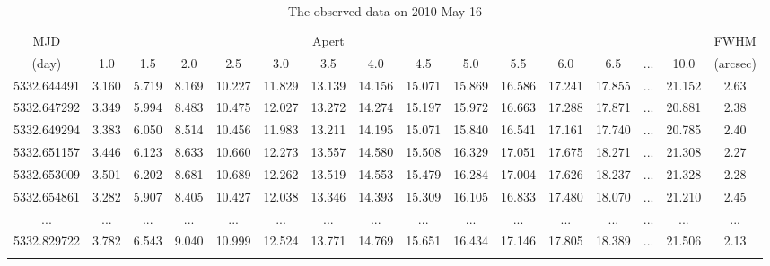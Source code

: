 \documentclass[structabstract]{raa}
\begin{document}
\begin{table}
\begin{center}
\begin{minipage}[]{100mm}
\caption[]{The observed data on 2010 May 16}
\label{Table3}
 \end{minipage}
 \setlength{\tabcolsep}{2.5pt}
\small
\begin{tabular}{cccccccccccccccc}
\hline\noalign{\smallskip}
  MJD  &   &   &   &  & &  Apert &    &    &   &  & &   &   &   &  FWHM  \\ \cline{2-15}

  (day)  &1.0  & 1.5  &2.0   & 2.5 &  3.0  & 3.5   & 4.0  & 4.5   &5.0   &5.5 & 6.0 & 6.5 & ...  & 10.0& (arcsec)  \\

\hline\noalign{\smallskip}
5332.644491  & 3.160  & 5.719  & 8.169  &10.227  &11.829  &13.139  &14.156  &15.071  &15.869  &16.586  &17.241  &17.855  & ...  &21.152  & 2.63  \\
5332.647292  & 3.349  & 5.994  & 8.483  &10.475  &12.027  &13.272  &14.274  &15.197  &15.972  &16.663  &17.288  &17.871  & ...  &20.881  & 2.38  \\
5332.649294  & 3.383  & 6.050  & 8.514  &10.456  &11.983  &13.211  &14.195  &15.071  &15.840  &16.541  &17.161  &17.740  & ...  &20.785  & 2.40  \\
5332.651157  & 3.446  & 6.123  & 8.633  &10.660  &12.273  &13.557  &14.580  &15.508  &16.329  &17.051  &17.675  &18.271  & ...  &21.308  & 2.27  \\
5332.653009  & 3.501  & 6.202  & 8.681  &10.689  &12.262  &13.519  &14.553  &15.479  &16.284  &17.004  &17.626  &18.237  & ...  &21.328  & 2.28  \\
5332.654861  & 3.282  & 5.907  & 8.405  &10.427  &12.038  &13.346  &14.393  &15.309  &16.105  &16.833  &17.480  &18.070  & ...  &21.210  & 2.45  \\
 ...         & ...    & ...    & ...    & ...    & ...    & ...    & ...    & ...    & ...    & ...    & ...    & ...    & ...  & ...    & ...   \\
5332.829722  & 3.782  & 6.543  & 9.040  &10.999  &12.524  &13.771  &14.769  &15.651  &16.434  &17.146  &17.805  &18.389  & ...  &21.506  & 2.13 \\
\noalign{\smallskip}\hline
\end{tabular}
\end{center}
\end{table}
\end{document}
